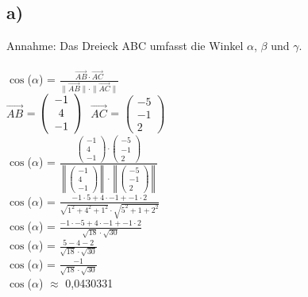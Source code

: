 \documentclass{article}
\begin{document}
	\subsection*{a)}
	Annahme: Das Dreieck ABC umfasst die Winkel $\alpha$, $\beta$ und $\gamma$. \\
	\\
	$\cos$($\alpha$) = $\frac{\vec{AB} \cdot \vec{AC}}{\|\vec{AB}\| \cdot \|\vec{AC}\|}$ \\
	$\vec{AB}$ = 
	$
	\left(\begin{array}{c}
	-1 \\ 4  \\ -1
	\end{array}\right) \\
	$
	$\vec{AC}$ = 
	$
	\left(\begin{array}{c}
	-5 \\ -1 \\ 2
	\end{array}\right)
	$ \\
	$\cos$($\alpha$) =
	$\frac{  \left(\begin{array}{c}
		-1 \\ 4  \\ -1
		\end{array}\right) 
	\cdot
	 \left(\begin{array}{c}
	 -5 \\ -1 \\ 2
	 \end{array}\right)}{\left\|\left(\begin{array}{c}
	 -1 \\ 4  \\ -1
	 \end{array}\right)\right\| \cdot \left\|\left(\begin{array}{c}
	 -5 \\ -1 \\ 2
	 \end{array}\right)\right\| }$ \\
	$\cos$($\alpha$) = $\frac{-1 \cdot 5 + 4 \cdot -1 + -1 \cdot 2}{\sqrt{1^2 + 4^2 +1^2} \cdot \sqrt{5^2 + 1 + 2^2}}$ \\
	$\cos$($\alpha$) = $\frac{-1 \cdot -5 + 4 \cdot -1 + -1 \cdot 2}{\sqrt{18} \cdot \sqrt{30}}$ \\
	$\cos$($\alpha$) = $\frac{5  - 4 - 2}{\sqrt{18} \cdot \sqrt{30}}$ \\
	$\cos$($\alpha$) = $\frac{-1}{\sqrt{18} \cdot \sqrt{30}}$ \\
	$\cos$($\alpha$) $\approx$ 0,0430331 \\
\end{document}
